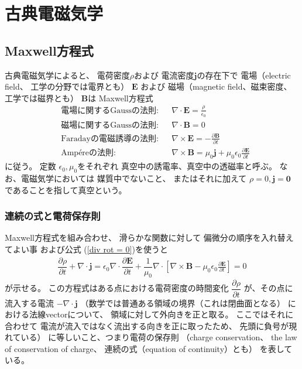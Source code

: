 \section{古典電磁気学}

\subsection{Maxwell方程式}

古典電磁気学によると、
電荷密度$\rho$および
電流密度$\bm{j}$の存在下で
電場（electric field、
工学の分野では電界とも）
$\bm{E}$
および
磁場（magnetic field、磁束密度、
工学では磁界とも）
$\bm{B}$は
Maxwell方程式
\begin{subequations}
\begin{align}
&\text{電場に関するGaussの法則}:
  &&\nabla \cdot \bm{E}
=
  \frac{\rho}{\epsilon_0}
\label{eq:maxwell-divE}
\\
&\text{磁場に関するGaussの法則}:
  &&\nabla \cdot \bm{B}
= 0
\label{eq:maxwell-divB}
\\
&\text{Faradayの電磁誘導の法則}:
  &&\nabla \times \bm{E}
=
  - \frac{\partial \bm{B}}
    {\partial t}
\label{eq:maxwell-rot E}
\\
&\text{Amp\'ereの法則}:
  &&\nabla \times \bm{B}
=
  \mu_0 \bm{j}
  +
  \mu_0 \epsilon_0
    \frac{\partial \bm{E}}
      {\partial t}
\label{eq:maxwell-rot B}
\end{align}
\end{subequations}
に従う。
定数
$\epsilon_0, \mu_0$をそれぞれ
真空中の誘電率、真空中の透磁率と呼ぶ。
なお、電磁気学においては
媒質中でないこと、
またはそれに加えて
$\rho = 0, \bm{j} = \bm{0}$
であることを指して真空という。

\subsubsection{連続の式と電荷保存則}

Maxwell方程式を組み合わせ、
滑らかな関数に対して
偏微分の順序を入れ替えてよい事
および公式
(\ref{div rot = 0})を使うと
\begin{align}
  \dfrac{\partial \rho}{\partial t}
+
  \nabla \cdot \bm{j}
=
  \epsilon_0
  \nabla \cdot
  \dfrac{\partial \bm{E}}{\partial t}
+
  \dfrac{1}{\mu_0}
  \nabla \cdot
  \left[
    \nabla \times \bm{B}
  -
    \mu_0 \epsilon_0
    \frac{\partial \bm{E}}
      {\partial t}
  \right]
= 0
\label{electric charge conservation}
\end{align}
が示せる。
この方程式はある点における電荷密度の時間変化
$\dfrac{\partial \rho}{\partial t}$
が、その点に流入する電流
$- \nabla \cdot \bm{j}$
（数学では普通ある領域の境界（これは閉曲面となる）
における法線vectorについて、
領域に対して外向きを正と取る。
ここではそれに合わせて
電流が流入ではなく流出する向きを正に取ったため、
先頭に負号が現れている）
に等しいこと、つまり電荷の保存則
（charge conservation、
the law of conservation of charge、
連続の式（equation of continuity）とも）
を表している。

